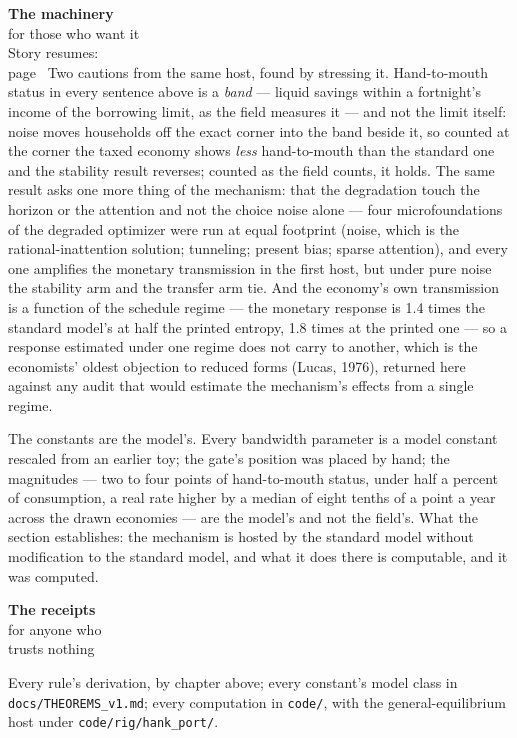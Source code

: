 \begin{machinery}{\textbf{The machinery}\\for those who want it\\[3pt]{\color{muted}Story resumes:\\page~\pageref{ch15}}}
Two cautions from the same host, found by stressing it. Hand-to-mouth
status in every sentence above is a \emph{band} --- liquid savings within a
fortnight's income of the borrowing limit, as the field measures it ---
and not the limit itself: noise moves households off the exact corner
into the band beside it, so counted at the corner the taxed economy
shows \emph{less} hand-to-mouth than the standard one and the stability
result reverses; counted as the field counts, it holds. The same
result asks one more thing of the mechanism: that the degradation
touch the horizon or the attention and not the choice noise alone ---
four microfoundations of the degraded optimizer were run at equal
footprint (noise, which is the rational-inattention solution;
tunneling; present bias; sparse attention), and every one amplifies
the monetary transmission in the first host, but under pure noise the
stability arm and the transfer arm tie. And the
economy's own transmission is a function of the schedule regime --- the
monetary response is 1.4 times the standard model's at half the
printed entropy, 1.8 times at the printed one --- so a response
estimated under one regime does not carry to another, which is the
economists' oldest objection to reduced forms (Lucas, 1976), returned
here against any audit that would estimate the mechanism's effects
from a single regime.

The constants are the model's. Every bandwidth parameter is a model constant rescaled from an
earlier toy; the gate's position was placed by hand; the magnitudes ---
two to four points of hand-to-mouth status, under half a percent of
consumption, a real rate higher by a median of eight tenths of a
point a year across the drawn economies --- are the model's and not the
field's. What the section
establishes: the mechanism is hosted by the standard model
without modification to the standard model, and what it does there
is computable, and it was computed.

\end{machinery}

\begin{receipts}{\textbf{The receipts}\\for anyone who\\trusts nothing}


Every rule's derivation, by chapter above; every constant's model
class in \texttt{docs/\allowbreak{}THEOREMS\_\allowbreak{}v1.\allowbreak{}md}; every computation in \texttt{code/\allowbreak{}}, with
the general-equilibrium host under \texttt{code/\allowbreak{}rig/\allowbreak{}hank\_\allowbreak{}port/\allowbreak{}}.

\end{receipts}

